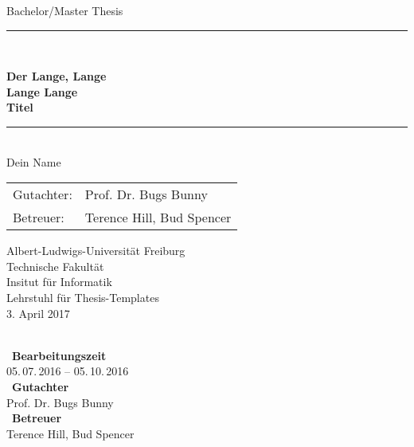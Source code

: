 
\begin{titlepage}
\begin{center}

\newcommand{\HorizontalLine}{\rule{\linewidth}{0.3mm}}

{\Large Bachelor/Master Thesis}\\[1.3cm]


\HorizontalLine \\[0.4cm]
\begin{spacing}{3}
    {\huge \bfseries Der Lange, Lange } \\
    {\huge \bfseries Lange Lange} \\
    {\huge \bfseries Titel}\\
\end{spacing}
\HorizontalLine \\[1.5cm]


{\Huge Dein Name} \\[2cm]


\begin{tabular}[hc]{>{\huge}l >{\huge}l}
  Gutachter: & Prof. Dr. Bugs Bunny \\[0.3cm]
  Betreuer: & Terence Hill, Bud Spencer \\[1.2cm]
\end{tabular}
\vfill  %

\Large {
    Albert-Ludwigs-Universität Freiburg\\
    Technische Fakultät\\
    Insitut für Informatik\\
    Lehrstuhl für Thesis-Templates\\[1cm]

    3. April 2017
    \\
}
\end{center}
\end{titlepage}

\ \vfill \ \\  %
\
\textbf{Bearbeitungszeit}            \smallskip{} \\
05.\,07.\,2016 -- 05.\,10.\,2016   \bigskip{} \\
\
\textbf{Gutachter}                  \smallskip{} \\
Prof. Dr. Bugs Bunny               \bigskip{} \\
\
\textbf{Betreuer}                  \smallskip{} \\
Terence Hill, Bud Spencer
